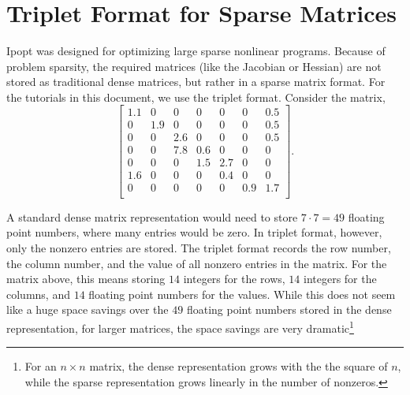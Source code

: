 \documentclass[letter,10pt]{article}
\begin{document}
{\section{Triplet Format for Sparse Matrices}\label{app.triplet}
Ipopt was designed for optimizing large sparse nonlinear programs. 
Because of problem sparsity, the required matrices (like the Jacobian or Hessian) are not stored as traditional dense matrices, but rather in a sparse matrix format. For the tutorials in this document, we use the triplet format. 
Consider the matrix,
\[
\left[
\begin{array}{ccccccc}
1.1     & 0             & 0             & 0             & 0             & 0             & 0.5 \\
0       & 1.9   & 0             & 0             & 0             & 0             & 0.5 \\
0       & 0             & 2.6   & 0             & 0             & 0             & 0.5 \\
0       & 0             & 7.8   & 0.6   & 0             & 0             & 0    \\
0       & 0             & 0             & 1.5   & 2.7   & 0             & 0     \\
1.6     & 0             & 0             & 0             & 0.4   & 0             & 0     \\
0       & 0             & 0             & 0             & 0             & 0.9   & 1.7 \\
\end{array}
\right].
\]

A standard dense matrix representation would need to store $7 \cdot
7{=} 49$ floating point numbers, where many entries would be zero. In
triplet format, however, only the nonzero entries are stored. The
triplet format records the row number, the column number, and the
value of all nonzero entries in the matrix. For the matrix above, this
means storing $14$ integers for the rows, $14$ integers for the
columns, and $14$ floating point numbers for the values. While this
does not seem like a huge space savings over the $49$ floating point
numbers stored in the dense representation, for larger matrices, the
space savings are very dramatic\footnote{For an $n \times n$ matrix,
  the dense representation grows with the the square of $n$, while the
  sparse representation grows linearly in the number of nonzeros.}

}
\end{document}
